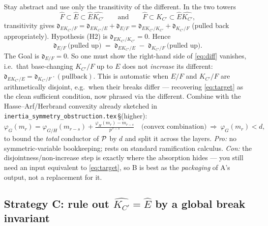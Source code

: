 \documentclass[11pt]{article}
\begin{document}
Stay abstract and use only the transitivity of the different. In the two towers
\[
\widehat F\subset\widehat E\subset \widehat E\widehat{K_{C'}}
\qquad\text{and}\qquad
\widehat F\subset\widehat{K_{C'}}\subset \widehat E\widehat{K_{C'}},
\]
transitivity gives
$\mathfrak d_{E K_{C'}/F}
   =\mathfrak d_{E K_{C'}/E}+\mathfrak d_{E/F}
   =\mathfrak d_{E K_{C'}/K_{C'}}+\mathfrak d_{K_{C'}/F}$
(pulled back appropriately). Hypothesis (H2) is
$\mathfrak d_{E K_{C'}/K_{C'}}=0$. Hence
\begin{equation}\label{eq:diff}
\mathfrak d_{E/F}\ \big(\text{pulled up}\big)
   \;=\;\mathfrak d_{E K_{C'}/E}\;-\;\mathfrak d_{K_{C'}/F}\ \big(\text{pulled up}\big).
\end{equation}
The Goal is $\mathfrak d_{E/F}=0$. So one must show the right-hand side of
\cref{eq:diff} vanishes, i.e.\ that base-changing $K_{C'}/F$ up to $E$ does not
\emph{increase} its different: $\mathfrak d_{E K_{C'}/E}=\mathfrak
d_{K_{C'}/F}\cdot(\text{pullback})$. This is automatic when $E/F$ and
$K_{C'}/F$ are arithmetically disjoint, e.g.\ when their breaks differ ---
recovering \cref{eq:target} as the clean sufficient condition, now phrased via
the different. Combine with the Hasse--Arf/Herbrand convexity already sketched
in \texttt{inertia\_symmetry\_obstruction.tex}\,\S(higher):
\[
\varphi_G(m_r)=\varphi_{G/H}(m_{r-s})+\tfrac{\varphi_H(m_r)-m_{r-s}}{p^{\,r-s}}
\quad\text{(convex combination)}\ \Rightarrow\ \varphi_G(m_r)<d ,
\]
to bound the \emph{total} conductor of $\mathcal{P}$ by $d$ and split it across the
layers. \emph{Pro:} no symmetric-variable bookkeeping; rests on standard
ramification calculus. \emph{Con:} the disjointness/non-increase step is exactly
where the absorption hides --- you still need an input equivalent to
\cref{eq:target}, so B is best as the \emph{packaging} of A's output, not a
replacement for it.

\subsection*{Strategy C: rule out $\widehat{K_{C'}}=\widehat E$ by a global
break invariant}
\end{document}
